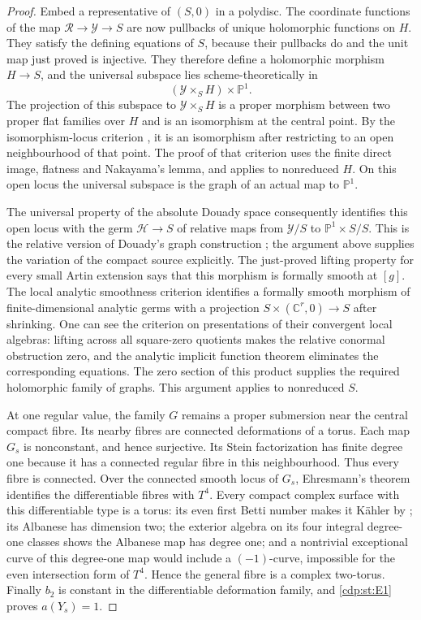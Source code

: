 \begin{proof}
Embed a representative of $(S,0)$ in a polydisc. The coordinate
functions of the map $\mathcal R\to\mathcal Y\to S$ are now
pullbacks of unique holomorphic functions on $H$. They satisfy
the defining equations of $S$, because their pullbacks do and the
unit map just proved is injective. They therefore define a
holomorphic morphism $H\to S$, and the universal subspace lies
scheme-theoretically in
\[
 (\mathcal Y\times_S H)\times\mathbb P^1.
\]
The projection of this subspace to $\mathcal Y\times_S H$ is a
proper morphism between two proper flat families over $H$ and
is an isomorphism at the central point. By the isomorphism-locus
criterion \cite[Section~10.1, Proposition~1, p.~86]{Douady1966},
it is an isomorphism after restricting to an open neighbourhood
of that point. The proof of that criterion uses the finite
direct image, flatness and Nakayama's lemma, and applies to
nonreduced $H$. On this open locus the universal subspace is
the graph of an actual map to $\mathbb P^1$.

The universal property of the absolute Douady space consequently
identifies this open locus with the germ $\mathcal H\to S$ of
relative maps from $\mathcal Y/S$ to
$\mathbb P^1\times S/S$. This is the relative version of
Douady's graph construction
\cite[Section~10.2, Theorem~1, p.~87]{Douady1966}; the argument
above supplies the variation of the compact source explicitly.
The just-proved lifting property for every
small Artin extension says that this morphism is formally smooth
at $[g]$. The local analytic smoothness criterion identifies a
formally smooth morphism of finite-dimensional analytic germs with
a projection $S\times(\mathbb C^r,0)\to S$ after shrinking. One
can see the criterion on presentations of their convergent local
algebras: lifting across all square-zero quotients makes the
relative conormal obstruction zero, and the analytic implicit
function theorem eliminates the corresponding equations. The
zero section of this product supplies the required holomorphic
family of graphs. This argument applies to nonreduced $S$.

At one regular value, the family $G$ remains a proper submersion
near the central compact fibre. Its nearby fibres are connected
deformations of a torus. Each map $G_s$ is nonconstant, and hence
surjective. Its Stein factorization has finite degree one because
it has a connected regular fibre in this neighbourhood. Thus
every fibre is connected. Over the connected smooth locus of
$G_s$, Ehresmann's theorem identifies the differentiable fibres
with $T^4$. Every compact complex surface with this differentiable
type is a torus: its even first Betti number makes it K\"ahler
by \cite[Theorem 11]{Buchdahl1999};
its Albanese has dimension two; the exterior algebra on its four
integral degree-one classes shows the Albanese map has degree one;
and a nontrivial exceptional curve of this degree-one map would
include a $(-1)$-curve, impossible for the even intersection form
of $T^4$. Hence the general fibre is a complex two-torus.
Finally $b_2$ is constant in the differentiable deformation family,
and \ref{cdp:st:E1} proves $a(Y_s)=1$.
\end{proof}

